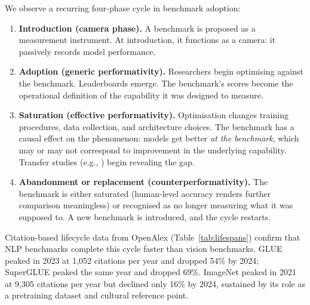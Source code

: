\documentclass{article}
\begin{document}
We observe a recurring four-phase cycle in benchmark adoption:

\begin{enumerate}[leftmargin=*]
\item \textbf{Introduction (camera phase).} A benchmark is proposed as a measurement instrument. At introduction, it functions as a camera: it passively records model performance.
\item \textbf{Adoption (generic performativity).} Researchers begin optimising against the benchmark. Leaderboards emerge. The benchmark's scores become the operational definition of the capability it was designed to measure.
\item \textbf{Saturation (effective performativity).} Optimisation changes training procedures, data collection, and architecture choices. The benchmark has a causal effect on the phenomenon: models get better \textit{at the benchmark}, which may or may not correspond to improvement in the underlying capability. Transfer studies (e.g., \citealt{recht_imagenet_2019}) begin revealing the gap.
\item \textbf{Abandonment or replacement (counterperformativity).} The benchmark is either saturated (human-level accuracy renders further comparison meaningless) or recognised as no longer measuring what it was supposed to. A new benchmark is introduced, and the cycle restarts.
\end{enumerate}

Citation-based lifecycle data from OpenAlex (Table~\ref{tab:lifespans}) confirm that NLP benchmarks complete this cycle faster than vision benchmarks. GLUE peaked in 2023 at 1,052 citations per year and dropped 54\% by 2024; SuperGLUE peaked the same year and dropped 69\%. ImageNet peaked in 2021 at 9,305 citations per year but declined only 16\% by 2024, sustained by its role as a pretraining dataset and cultural reference point.
\end{document}
